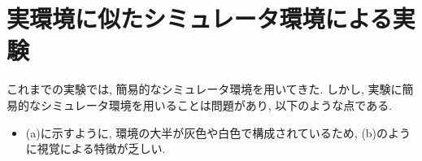 
\section{実環境に似たシミュレータ環境による実験}
これまでの実験では, 簡易的なシミュレータ環境を用いてきた. しかし, 実験に簡易的なシミュレータ環境を用いることは問題があり, 以下のような点である.

\begin{itemize}



  \item {} (a)に示すように, 環境の大半が灰色や白色で構成されているため,  (b)のように視覚による特徴が乏しい. 
  

\end{itemize}
